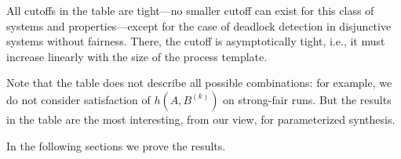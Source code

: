 All cutoffs in the table are tight---no smaller cutoff can exist for 
this class of systems and properties---except for the case of deadlock 
detection in disjunctive systems without fairness. There, the cutoff is 
asymptotically tight, i.e., it must increase linearly with the size 
of the process template.

Note that the table does not describe all possible combinations:
for example, we do not consider satisfaction of $h(A,B^{(k)})$ on strong-fair runs.
But the results in the table are the most interesting, from our view,
for parameterized synthesis.

In the following sections we prove the results.
